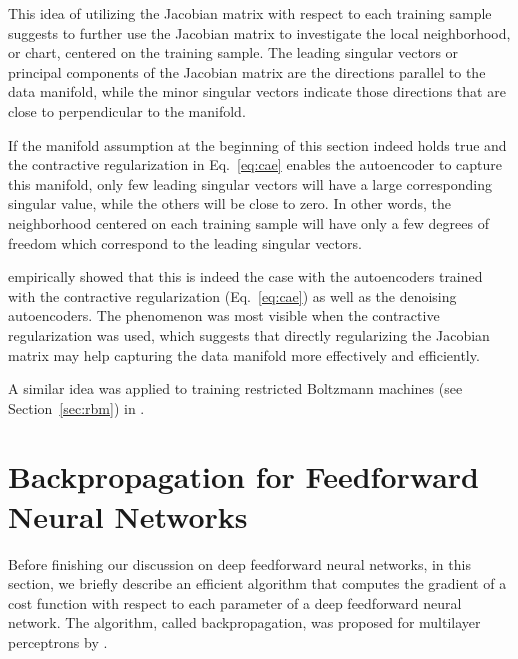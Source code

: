 \documentclass[dissertation,nocontribution]{aaltoseries}
\begin{document}
This idea of utilizing the Jacobian matrix with respect to
each training sample suggests to further use the Jacobian
matrix to investigate the local neighborhood, or chart,
centered on the training sample. The leading singular
vectors or principal components of the Jacobian matrix are
the directions parallel to the data manifold, while the
minor singular vectors indicate those directions that are
close to perpendicular to the manifold.

If the manifold assumption at the beginning of this section
indeed holds true and the contractive regularization in
Eq.~\eqref{eq:cae} enables the autoencoder to capture this
manifold, only few leading singular vectors will have a large
corresponding singular value, while the others will be
close to zero. In other words, the neighborhood
centered on each training sample will have only a few
degrees of freedom which correspond to the leading singular
vectors.

\citet{Rifai2011} empirically showed that this is indeed the
case with the autoencoders trained with the contractive
regularization (Eq.~\eqref{eq:cae}) as well as the denoising
autoencoders. The phenomenon was most visible when the
contractive regularization was used, which suggests that
directly regularizing the Jacobian matrix may help capturing
the data manifold more effectively and efficiently.

A similar idea was applied to training restricted Boltzmann
machines (see Section~\ref{sec:rbm}) in
.


\section{Backpropagation for Feedforward Neural Networks}
\label{sec:backprop}

Before finishing our discussion on deep feedforward neural
networks, in this section, we briefly describe an efficient
algorithm that computes the gradient of a cost function with
respect to each parameter of a deep feedforward neural network.
The algorithm, called backpropagation, was proposed for
multilayer perceptrons by \citet{Rumelhart1986}. 

\end{document}
